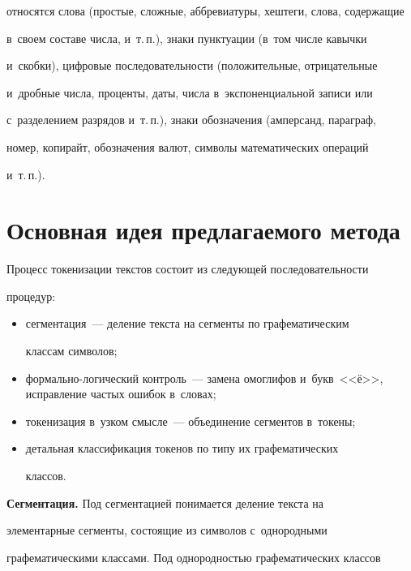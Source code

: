 относятся слова (простые, сложные, аббревиатуры, хештеги, слова, содержащие 


в~своем составе числа, и~т.\,п.), знаки пунктуации (в~том числе кавычки 


и~скобки), циф\-ро\-вые последовательности (положительные, отрицательные 


и~дробные числа, проценты, даты, числа в~экспоненциальной записи или 


с~разделением разрядов и~т.\,п.), знаки обозначения (амперсанд, параграф, 


номер, копирайт, обозначения валют, символы математических операций 


и~т.\,п.). 





\section{Основная идея предлагаемого метода}


  


  Процесс токенизации текстов состоит из следующей последовательности 


процедур:


  \begin{itemize}


\item сегментация~--- деление текста на сегменты по графематическим 


классам символов;


\item формально-логический контроль~--- замена омоглифов и~букв~<<ё>>, исправление частых ошибок в~словах;


\item токенизация в~узком смысле~--- объединение сегментов в~токены;


\item детальная классификация токенов по типу их графематических 


классов.


\end{itemize}





  \textbf{Сегментация.} Под сегментацией понимается деление текста на 


элементарные сегменты, состоящие из символов с~однородными 


графематическими классами. Под однородностью графематических классов 


